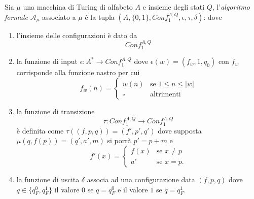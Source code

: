 \begin{defi}
Sia $\mu$ una macchina di Turing di alfabeto $A$ e insieme degli stati $Q$, l'\emph{algoritmo formale} $\mathcal{A}_\mu$ associato a $\mu$ è la tupla $(A,\{0,1\}, Conf_1^{A,Q},\epsilon, \tau, \delta)$: dove
\begin{enumerate}
\item l'insieme delle configurazioni è dato da
\[
Conf_1^{A,Q}
\]

\item la funzione di input $\epsilon : A^* \to Conf_1^{A,Q}$ dove $\epsilon(w) = (f_w, 1, q_0)$ con $f_w$ corrisponde alla funzione nastro per cui
\[
f_w(n) = \begin{cases} w(n) & \text{se } 1 \le n \le |w| \\ \square & \text{altrimenti} \end{cases}
\]

\item la funzione di transizione
\[
\tau : Conf_1^{A,Q} \to Conf_1^{A,Q}
\]
è definita come $\tau((f,p,q)) = (f',p',q')$ dove supposta $\mu(q,f(p)) = (q',a',m)$ si porrà $p' = p+m$ e
\[
f'(x) = \begin{cases} f(x) & \text{se } x \neq p \\ a' & \text{se } x = p. \end{cases}
\]

\item la funzione di uscita $\delta$ associa ad una configurazione data $(f,p,q)$ dove $q \in \{q_F^0, q_F^1\}$ il valore $0$ se $q = q_F^0$ e il valore $1$ se $q = q_F^1$.
\end{enumerate}
\end{defi}

